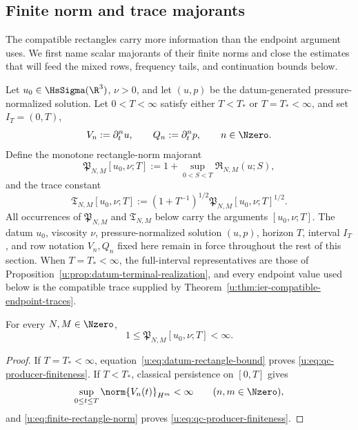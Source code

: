 \subsection{Finite norm and trace majorants}

The compatible rectangles carry more information than the endpoint argument
uses.  We first name scalar majorants of their finite norms and close the estimates that will
feed the mixed rows, frequency tails, and continuation bounds below.

\begin{definition}
\label{u:def:qc-producer-constants}
Let \(u_0\in\HsSigma(\R^3)\), \(\nu>0\), and let \((u,p)\) be the
datum-generated pressure-normalized solution.  Let \(0<T<\infty\) satisfy
either \(T<T_*\) or \(T=T_*<\infty\), and set
\(I_T=(0,T)\),
\[
 V_n:=\partial_t^n u,
 \qquad
 Q_n:=\partial_t^n p,
 \qquad n\in\Nzero.
\]
Define the monotone rectangle-norm majorant
\begin{equation}
 \mathfrak P_{N,M}[u_0,\nu;T]
 :=1+\sup_{0<S<T}\mathfrak R_{N,M}(u;S),
 \label{u:eq:qc-producer-constant}
\end{equation}
and the trace constant
\begin{equation}
 \mathfrak T_{N,M}[u_0,\nu;T]
 :=\left(1+T^{-1}\right)^{1/2}
   \mathfrak P_{N,M}[u_0,\nu;T]^{1/2}.
 \label{u:eq:qc-trace-constant}
\end{equation}
All occurrences of \(\mathfrak P_{N,M}\) and \(\mathfrak T_{N,M}\) below
carry the arguments \([u_0,\nu;T]\).
The datum \(u_0\), viscosity \(\nu\), pressure-normalized solution
\((u,p)\), horizon \(T\), interval \(I_T\), and row notation \(V_n,Q_n\)
fixed here remain in force throughout the rest of this section.
When \(T=T_*<\infty\), the full-interval representatives are those of
Proposition~\ref{u:prop:datum-terminal-realization}, and every endpoint value
used below is the compatible trace supplied by
Theorem~\ref{u:thm:ier-compatible-endpoint-traces}.
\end{definition}

\begin{lemma}
\label{u:lem:qc-producer-finiteness}
For every \(N,M\in\Nzero\),
\begin{equation}
 1\le \mathfrak P_{N,M}[u_0,\nu;T]<\infty.
 \label{u:eq:qc-producer-finiteness}
\end{equation}
\end{lemma}

\begin{proof}
If \(T=T_*<\infty\), equation~\eqref{u:eq:datum-rectangle-bound} proves
\eqref{u:eq:qc-producer-finiteness}.  If \(T<T_*\), classical persistence on
\([0,T]\) gives
\[
 \sup_{0\le t\le T}\norm{V_n(t)}_{H^m}<\infty
 \qquad(n,m\in\Nzero),
\]
and \eqref{u:eq:finite-rectangle-norm} proves
\eqref{u:eq:qc-producer-finiteness}.
\end{proof}

